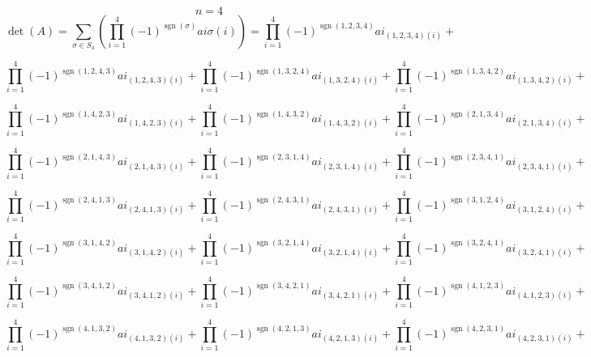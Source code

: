 \documentclass[12pt]{article}
\begin{document}
\newpage

\paragraph{}
    $$n = 4$$
    $$\operatorname{det}(A)=\sum_{\sigma \in S_{4}}  \left(\prod_{i=1}^{4} (-1)^ {\operatorname{sgn}(\sigma)}  ai \sigma (i) \right) = 
    \prod_{i=1}^{4} (-1)^ {\operatorname{sgn}(1, 2, 3, 4)}  ai_{(1, 2, 3, 4) (i)} + $$
    
    $$\prod_{i=1}^{4} (-1)^ {\operatorname{sgn}(1, 2, 4, 3)}  ai_{(1, 2, 4, 3) (i)} + 
    \prod_{i=1}^{4} (-1)^ {\operatorname{sgn}(1, 3, 2, 4)}  ai_{(1, 3, 2, 4) (i)} + 
    \prod_{i=1}^{4} (-1)^ {\operatorname{sgn}(1, 3, 4, 2)}  ai_{(1, 3, 4, 2) (i)} + $$
    
    $$\prod_{i=1}^{4} (-1)^ {\operatorname{sgn}(1, 4, 2, 3)}  ai_{(1, 4, 2, 3) (i)} + 
    \prod_{i=1}^{4} (-1)^ {\operatorname{sgn}(1, 4, 3, 2)}  ai_{(1, 4, 3, 2) (i)} + 
    \prod_{i=1}^{4} (-1)^ {\operatorname{sgn}(2, 1, 3, 4)}  ai_{(2, 1, 3, 4) (i)} + $$
    
    $$\prod_{i=1}^{4} (-1)^ {\operatorname{sgn}(2, 1, 4, 3)}  ai_{(2, 1, 4, 3) (i)} + 
    \prod_{i=1}^{4} (-1)^ {\operatorname{sgn}(2, 3, 1, 4)}  ai_{(2, 3, 1, 4) (i)} + 
    \prod_{i=1}^{4} (-1)^ {\operatorname{sgn}(2, 3, 4, 1)}  ai_{(2, 3, 4, 1) (i)} + $$
    
    $$\prod_{i=1}^{4} (-1)^ {\operatorname{sgn}(2, 4, 1, 3)}  ai_{(2, 4, 1, 3) (i)} + 
    \prod_{i=1}^{4} (-1)^ {\operatorname{sgn}(2, 4, 3, 1)}  ai_{(2, 4, 3, 1) (i)} + 
    \prod_{i=1}^{4} (-1)^ {\operatorname{sgn}(3, 1, 2, 4)}  ai_{(3, 1, 2, 4) (i)} + $$
    
    $$\prod_{i=1}^{4} (-1)^ {\operatorname{sgn}(3, 1, 4, 2)}  ai_{(3, 1, 4, 2) (i)} + 
    \prod_{i=1}^{4} (-1)^ {\operatorname{sgn}(3, 2, 1, 4)}  ai_{(3, 2, 1, 4) (i)} + 
    \prod_{i=1}^{4} (-1)^ {\operatorname{sgn}(3, 2, 4, 1)}  ai_{(3, 2, 4, 1) (i)} + $$
    
    $$\prod_{i=1}^{4} (-1)^ {\operatorname{sgn}(3, 4, 1, 2)}  ai_{(3, 4, 1, 2) (i)} + 
    \prod_{i=1}^{4} (-1)^ {\operatorname{sgn}(3, 4, 2, 1)}  ai_{(3, 4, 2, 1) (i)} + 
    \prod_{i=1}^{4} (-1)^ {\operatorname{sgn}(4, 1, 2, 3)}  ai_{(4, 1, 2, 3) (i)} + $$
    
    $$\prod_{i=1}^{4} (-1)^ {\operatorname{sgn}(4, 1, 3, 2)}  ai_{(4, 1, 3, 2) (i)} + 
    \prod_{i=1}^{4} (-1)^ {\operatorname{sgn}(4, 2, 1, 3)}  ai_{(4, 2, 1, 3) (i)} + 
    \prod_{i=1}^{4} (-1)^ {\operatorname{sgn}(4, 2, 3, 1)}  ai_{(4, 2, 3, 1) (i)} + $$
    
\end{document}
